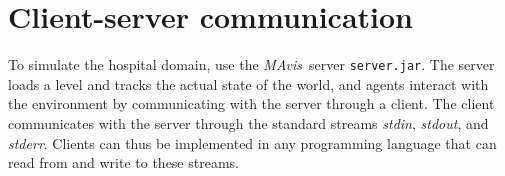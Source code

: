 \documentclass[12pt,a4paper]{article}
\def\mavis{{\itshape MAvis}}
\begin{document}
\section{Client-server communication}\label{sect:env}


To simulate the hospital domain, use the \mavis\ server \texttt{server.jar}. The server loads a level and tracks the actual state of the world, and agents interact with the environment by communicating with the server through a client. The client communicates with the server through the standard streams \emph{stdin}, \emph{stdout}, and \emph{stderr}. Clients can thus be implemented in any programming language that can read from and write to these streams.

\begin{table}
\begin{center}
\end{center}
\caption{Example of interaction between server and client.}
\label{tbl1:protocol_example}
\end{table}
\end{document}
